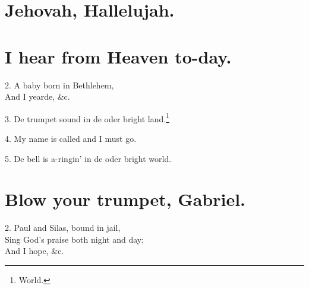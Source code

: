 \documentclass[a5paper,10pt]{book}
\begin{document}
\newpage
\section{Jehovah, Hallelujah.}
\thispagestyle{empty}

\begin{song}

\end{song}



\newpage
\section{I hear from Heaven to-day.}
\thispagestyle{empty}

\begin{song}

\end{song}

\begin{stanza}
\item[2.]
  A baby born in Bethlehem, \\
  And I yearde, \&c.

\item[3.]
  De trumpet sound in de oder bright land.\footnote[3]{World.}
  
\item[4.]
  My name is called and I must go.

\item[5.]
  De bell is a-ringin' in de oder bright world.
\end{stanza}


\newpage
\section{Blow your trumpet, Gabriel.}
\thispagestyle{empty}

\begin{song}
\end{song}

\begin{stanza}
\item[2.]
  Paul and Silas, bound in jail, \\
  Sing God's praise both night and day; \\
  And I hope, \&c.
\end{stanza}
\end{document}
